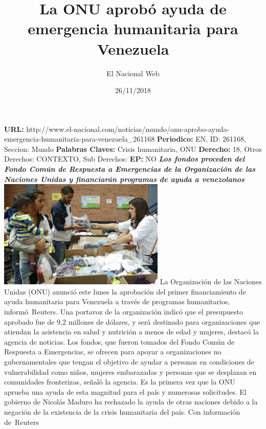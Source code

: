 \documentclass{article}%
\title{\textbf{La ONU aprobó ayuda de emergencia humanitaria para Venezuela}}%
\author{El Nacional Web}%
\date{26/11/2018}%
\begin{document}
%
\normalsize%
\maketitle%
\textbf{URL: }%
http://www.el{-}nacional.com/noticias/mundo/onu{-}aprobo{-}ayuda{-}emergencia{-}humanitaria{-}para{-}venezuela\_261168\newline%
%
\textbf{Periodico: }%
EN, %
ID: %
261168, %
Seccion: %
Mundo\newline%
%
\textbf{Palabras Claves: }%
Crisis humanitaria, ONU\newline%
%
\textbf{Derecho: }%
18, %
Otros Derechos: %
CONTEXTO, %
Sub Derechos: %
\newline%
%
\textbf{EP: }%
NO\newline%
\newline%
%
\textbf{\textit{Los fondos proceden del Fondo Común de Respuesta a Emergencias de la Organización de las Naciones Unidas y financiarán programas de ayuda a venezolanos}}%
\newline%
\newline%
%
\includegraphics[width=300px]{222.jpg}%
\newline%
%
La Organización de las Naciones Unidas (ONU) anunció este lunes la aprobación del primer financiamiento de ayuda humanitaria para Venezuela a través de programas humanitarios, informó~Reuters.%
\newline%
%
Una portavoz de la organización indicó que el presupuesto aprobado fue de 9,2 millones de dólares, y será destinado para organizaciones que atiendan la asistencia en salud y nutrición a menos de edad y mujeres, destacó la agencia de noticias.%
\newline%
%
Los fondos, que fueron tomados del Fondo Común de Respuesta a Emergencias, se ofrecen para apoyar a organizaciones no gubernamentales que tengan el objetivo de ayudar a personas en condiciones de vulnerabilidad como niños, mujeres embarazadas y personas que se desplazan en comunidades fronterizas, señaló la agencia.%
\newline%
%
Es la primera vez que la ONU aprueba una ayuda de esta magnitud para el país y numerosas solicitudes. El gobierno de Nicolás Maduro ha rechazado la ayuda de otras naciones debido a la negación de la existencia de la crisis humanitaria del país.%
\newline%
%
Con información de~Reuters%
\newline%
%
\end{document}
